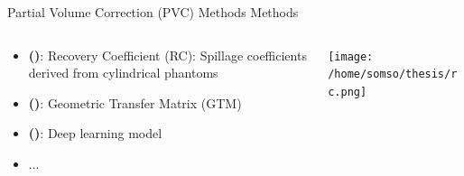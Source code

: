 \documentclass[aspectratio=169]{beamer}
\newcommand{\citeauthoryear}[1]{\citeauthor{#1} (\citeyear{#1})}
\begin{document}
\begin{frame}[t]{Partial Volume Correction (PVC) Methods Methods}
	\begin{columns}
		\begin{column}{0.65\textwidth}
			\small
			\begin{itemize}
				\setlength\itemsep{2em}
				\item \textbf{\citeauthoryear{feng2015image}}: Recovery Coefficient (RC): Spillage coefficients derived from cylindrical phantoms
				\item \textbf{\citeauthoryear{rousset1998correction}}: Geometric Transfer Matrix (GTM)
				\item \textbf{\citeauthoryear{ferrante2024physically}}: Deep learning model
				\item ...
			\end{itemize}
			\vspace{7em}
		\end{column}

		\begin{column}{0.35\textwidth}
			\texttt{[image: /home/somso/thesis/rc.png]}\par\vspace{1ex}


		\end{column}

	\end{columns}
\end{frame}
\end{document}
